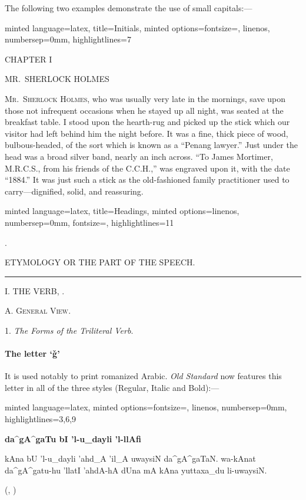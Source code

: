 The following two examples demonstrate the use of small capitals:---
\begin{tcblisting}{minted language=latex, title=Initials, minted
    options={fontsize=\smaller, linenos, numbersep=0mm,
      highlightlines={7}}}
  \begin{center}
    CHAPTER I

    MR.\ SHERLOCK HOLMES
  \end{center}
  
  \lettrine[loversize=0.2]{M}{r.\ Sherlock Holmes}, who was usually
  very late in the mornings, save upon those not infrequent occasions
  when he stayed up all night, was seated at the breakfast table. I
  stood upon the hearth-rug and picked up the stick which our visitor
  had left behind him the night before.  It was a fine, thick piece of
  wood, bulbous-headed, of the sort which is known as a
  \enquote{Penang lawyer.} Just under the head was a broad silver
  band, nearly an inch across. \enquote{To James Mortimer, M.R.C.S.,
    from his friends of the C.C.H.,} was engraved upon it, with the
  date \enquote{1884.} It was just such a stick as the old-fashioned
  family practitioner used to carry—dignified, solid, and reassuring.
\end{tcblisting}

\begin{tcblisting}{minted language=latex, title=Headings, minted
    options={linenos, numbersep=0mm, fontsize=\smaller,
      highlightlines={11}}}
  \doublespacing
  \begin{center}
    .

    ETYMOLOGY OR THE PART OF THE SPEECH.
    
    \rule{1in}{0.4pt}

    I. THE VERB, .

    A. \textsc{General View}.

    1. \emph{The Forms of the Triliteral Verb}.
  \end{center}
\end{tcblisting}

\paragraph{The letter \enquote*{ǧ}} It is used notably to print
romanized Arabic. \emph{Old Standard} now features this letter in all
of the three styles (Regular, Italic and Bold):---
\begin{tcblisting}{minted language=latex, minted
    options={fontsize=\smaller, linenos, numbersep=0mm,
      highlightlines={3,6,9}}}  
  \begin{arab}[trans]
    \begin{center}
      \textbf{da^gA^gaTu bI 'l-u_dayli 'l-llAfi}
    \end{center}
    kAna bU 'l-u_dayli 'ahd_A 'il_A uwaysiN
    da^gA^gaTaN. wa-kAnat da^gA^gatu-hu 'llatI 'ahdA-hA dUna mA kAna
    yuttaxa_du li-uwaysiN.

    (, )
  \end{arab}
\end{tcblisting}

